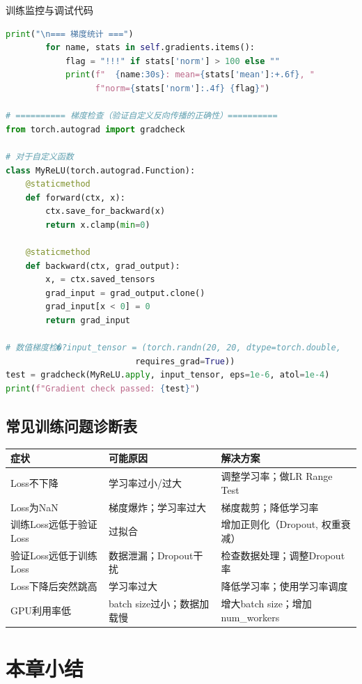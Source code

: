\begin{mycode}{训练监控与调试代码}
\begin{lstlisting}[language=Python]
        print("\n=== 梯度统计 ===")
        for name, stats in self.gradients.items():
            flag = "!!!" if stats['norm'] > 100 else ""
            print(f"  {name:30s}: mean={stats['mean']:+.6f}, "
                  f"norm={stats['norm']:.4f} {flag}")

# ========== 梯度检查（验证自定义反向传播的正确性）==========
from torch.autograd import gradcheck

# 对于自定义函数
class MyReLU(torch.autograd.Function):
    @staticmethod
    def forward(ctx, x):
        ctx.save_for_backward(x)
        return x.clamp(min=0)

    @staticmethod
    def backward(ctx, grad_output):
        x, = ctx.saved_tensors
        grad_input = grad_output.clone()
        grad_input[x < 0] = 0
        return grad_input

# 数值梯度检�?input_tensor = (torch.randn(20, 20, dtype=torch.double,
                          requires_grad=True))
test = gradcheck(MyReLU.apply, input_tensor, eps=1e-6, atol=1e-4)
print(f"Gradient check passed: {test}")
\end{lstlisting}
\end{mycode}

\subsection{常见训练问题诊断表}

\begin{center}
\begin{tabular}{p{3.5cm}|p{3.5cm}|p{5cm}}
\toprule
\textbf{症状} & \textbf{可能原因} & \textbf{解决方案} \\
\midrule
Loss不下降 & 学习率过小/过大 & 调整学习率；做LR Range Test \\
Loss为NaN & 梯度爆炸；学习率过大 & 梯度裁剪；降低学习率 \\
训练Loss远低于验证Loss & 过拟合 & 增加正则化（Dropout, 权重衰减） \\
验证Loss远低于训练Loss & 数据泄漏；Dropout干扰 & 检查数据处理；调整Dropout率 \\
Loss下降后突然跳高 & 学习率过大 & 降低学习率；使用学习率调度 \\
GPU利用率低 & batch size过小；数据加载慢 & 增大batch size；增加num\_workers \\
\bottomrule
\end{tabular}
\end{center}

\section{本章小结}

